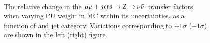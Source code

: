 \begin{figure}[]
  \centering
   ~~
  \\

  \caption{\label{fig:tfSyst_pu_mumuToZinv} The relative change in the $\mmj \rightarrow \znunu$ transfer
  factors when varying PU weight in MC within its uncertainties, as a function of \scalht and jet category. 
  Variations corresponding to $+1\sigma$ ($-1\sigma$) are shown in the left (right) figure. 
  }
\end{figure}

